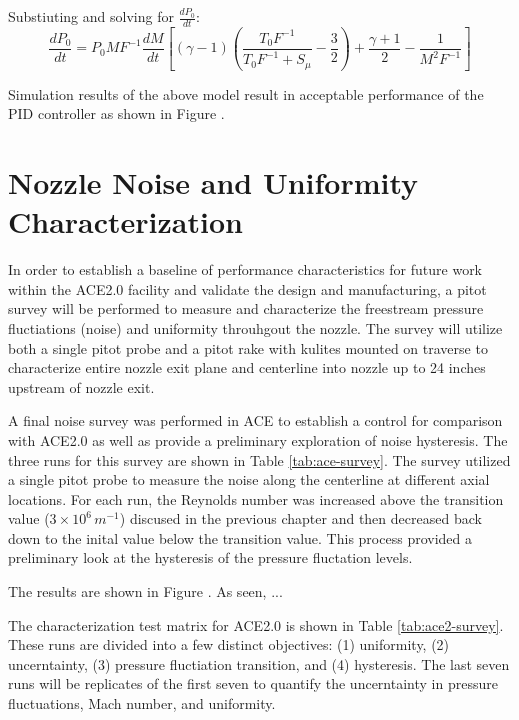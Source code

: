 Substiuting and solving for $\frac{dP_0}{dt}$:
\begin{equation}
    \frac{dP_0}{dt} = P_0 M F^{-1} \frac{dM}{dt} \left[ (\gamma-1) \left( \frac{T_0 F^{-1}}{T_0 F^{-1} + S_\mu} - \frac{3}{2} \right) + \frac{\gamma+1}{2} - \frac{1}{M^2 F^{-1}} \right]
\end{equation}

Simulation results of the above model result in acceptable performance of the PID controller as shown in Figure .

\section{Nozzle Noise and Uniformity Characterization}

In order to establish a baseline of performance characteristics for future work within the ACE2.0 facility and validate the design and manufacturing, a pitot survey will be performed to measure and characterize the freestream pressure fluctiations (noise) and uniformity throuhgout the nozzle. The survey will utilize both a single pitot probe and a pitot rake with kulites mounted on traverse to characterize entire nozzle exit plane and centerline into nozzle up to 24 inches upstream of nozzle exit.

A final noise survey was performed in ACE to establish a control for comparison with ACE2.0 as well as provide a preliminary exploration of noise hysteresis. The three runs for this survey are shown in Table \ref{tab:ace-survey}. The survey utilized a single pitot probe to measure the noise along the centerline at different axial locations. For each run, the Reynolds number was increased above the transition value ($3 \times 10^6 \, m^{-1}$) discused in the previous chapter and then decreased back down to the inital value below the transition value. This process provided a preliminary look at the hysteresis of the pressure fluctation levels.

The results are shown in Figure . As seen, ...

The characterization test matrix for ACE2.0 is shown in Table \ref{tab:ace2-survey}. These runs are divided into a few distinct objectives: (1) uniformity, (2) uncerntainty, (3) pressure fluctiation transition, and (4) hysteresis. The last seven runs will be replicates of the first seven to quantify the uncerntainty in pressure fluctuations, Mach number, and uniformity.

